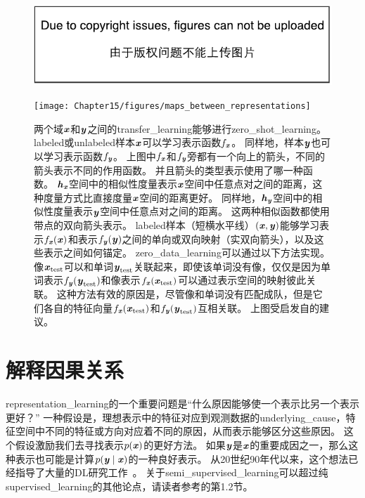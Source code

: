 

\begin{figure}[!htb]
\ifOpenSource
\centerline{\includegraphics{figure.pdf}}
\else
\centerline{\texttt{[image: Chapter15/figures/maps\_between\_representations]}}
\fi
\caption{两个域$\boldsymbol{\mathit{x}}$和$\boldsymbol{\mathit{y}}$之间的\gls{transfer_learning}能够进行\gls{zero_shot_learning}。
\gls{labeled}或\gls{unlabeled}样本$\boldsymbol{\mathit{x}}$可以学习表示函数$f_{\boldsymbol{\mathit{x}}}$。
同样地，样本$\boldsymbol{\mathit{y}}$也可以学习表示函数$f_{\boldsymbol{\mathit{y}}}$。
上图中$f_{\boldsymbol{\mathit{x}}}$和$f_{\boldsymbol{\mathit{y}}}$旁都有一个向上的箭头，不同的箭头表示不同的作用函数。
并且箭头的类型表示使用了哪一种函数。
$\boldsymbol{\mathit{h}}_{\boldsymbol{\mathit{x}}}$空间中的相似性度量表示$\boldsymbol{\mathit{x}}$空间中任意点对之间的距离，这种度量方式比直接度量$\boldsymbol{\mathit{x}}$空间的距离更好。
同样地，$\boldsymbol{\mathit{h}}_{\boldsymbol{\mathit{y}}}$空间中的相似性度量表示$\boldsymbol{\mathit{y}}$空间中任意点对之间的距离。
这两种相似函数都使用带点的双向箭头表示。
\gls{labeled}样本（短横水平线）$(\boldsymbol{\mathit{x}}, \boldsymbol{\mathit{y}})$能够学习表示$f_{\boldsymbol{\mathit{x}}}(\boldsymbol{\mathit{x}})$和表示$f_{\boldsymbol{\mathit{y}}}(\boldsymbol{\mathit{y}})$之间的单向或双向映射（实双向箭头），以及这些表示之间如何锚定。
\gls{zero_data_learning}可以通过以下方法实现。
像$\boldsymbol{\mathit{x}}_{\text{test}}$可以和单词$\boldsymbol{\mathit{y}}_{\text{test}}$关联起来，即使该单词没有像，仅仅是因为单词表示$f_{\boldsymbol{\mathit{y}}}(\boldsymbol{\mathit{y}}_{\text{test}})$和像表示$f_{\boldsymbol{\mathit{x}}}(\boldsymbol{\mathit{x}}_{\text{test}})$可以通过表示空间的映射彼此关联。
这种方法有效的原因是，尽管像和单词没有匹配成队，但是它们各自的特征向量$f_{\boldsymbol{\mathit{x}}}(\boldsymbol{\mathit{x}}_{\text{test}})$和$f_{\boldsymbol{\mathit{y}}}(\boldsymbol{\mathit{y}}_{\text{test}})$互相关联。
上图受启发自的建议。
}
\label{fig:chap15_maps_between_representations}
\end{figure}


\section{解释因果关系}
\label{sec:semi_supervised_disentangling_of_causal_factors}


\gls{representation_learning}的一个重要问题是``什么原因能够使一个表示比另一个表示更好？''
一种假设是，理想表示中的特征对应到观测数据的\gls{underlying_cause}，特征空间中不同的特征或方向对应着不同的原因，从而表示能够区分这些原因。
这个假设激励我们去寻找表示$p(\boldsymbol{\mathit{x}})$的更好方法。
如果$\boldsymbol{\mathit{y}}$是$\boldsymbol{\mathit{x}}$的重要成因之一，那么这种表示也可能是计算$p(\boldsymbol{\mathit{y}} \mid \boldsymbol{\mathit{x}})$的一种良好表示。
从20世纪90年代以来，这个想法已经指导了大量的\gls{DL}研究工作~\citep{Becker92,hinton1999unsupervised}。
关于\gls{semi_supervised_learning}可以超过纯\gls{supervised_learning}的其他论点，请读者参考\cite{Chapelle-2006}的第1.2节。

